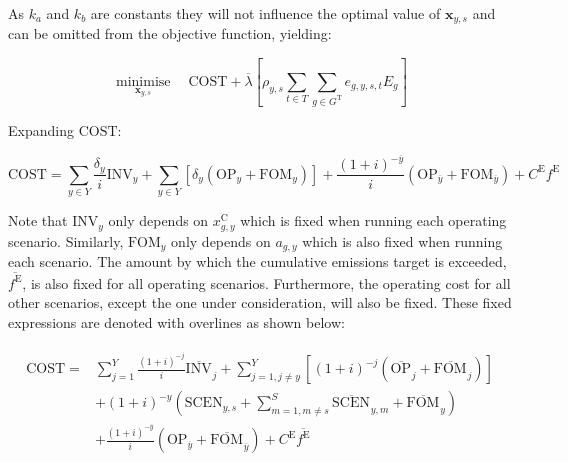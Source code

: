 \documentclass{article}
\newcommand{\sGeneratorsThermal}{G^{\mathrm{T}}}
\newcommand{\sYears}{Y}
\newcommand{\sScenarios}{S}
\newcommand{\sIntervals}{T}
\newcommand{\iGenerator}{g}
\newcommand{\iYear}{y}
\newcommand{\iYearTerminal}{\overline{\iYear}}
\newcommand{\iYearAlias}{j}
\newcommand{\iScenario}{s}
\newcommand{\iScenarioAlias}{m}
\newcommand{\iInterval}{t}
\newcommand{\cOperatingCost}[1][\iYear,\iScenario]{\mathrm{OP}_{#1}}
\newcommand{\cFixedOperationsMaintenanceCost}[1][\iYear]{\mathrm{FOM}_{#1}}
\newcommand{\cScenarioDuration}[1][\iYear,\iScenario]{\rho_{#1}}
\newcommand{\cEmissionsIntensity}[1][\iGenerator]{E_{#1}}
\newcommand{\cInvestmentCost}[1][\iYear]{\mathrm{INV}_{#1}}
\newcommand{\cInterestRate}{i}
\newcommand{\cEmissionsTargetViolationPenalty}{C^{\mathrm{E}}}
\newcommand{\cObjectiveFunction}{\mathrm{COST}}
\newcommand{\cOperatingCostScenario}[1][\iYear,\iScenario]{\mathrm{SCEN}_{#1}}
\newcommand{\cDiscountRate}[1][\iYear]{\delta_{#1}}
\newcommand{\vEnergy}[1][\iGenerator,\iYear,\iScenario,\iInterval]{e_{#1}}
\newcommand{\vInstalledCapacity}[1][\iGenerator,\iYear]{x^{\mathrm{C}}_{#1}}
\newcommand{\vEmissionsTargetViolation}{f^{\mathrm{E}}}
\newcommand{\vInstalledCapacityTotal}[1][\iGenerator,\iYear]{a_{#1}}
\DeclareMathOperator*{\minimise}{minimise}
\begin{document}
As $k_{a}$ and $k_{b}$ are constants they will not influence the optimal value of $\bm{x}_{\iYear,\iScenario}$ and can be omitted from the objective function, yielding:

\begin{equation}
	\minimise\limits_{\bm{x}_{\iYear,\iScenario}} \quad \cObjectiveFunction + \overline{\lambda} \left[\cScenarioDuration\sum\limits_{\iInterval \in \sIntervals}\sum\limits_{\iGenerator \in \sGeneratorsThermal} \vEnergy[\iGenerator,\iYear,\iScenario,\iInterval] \cEmissionsIntensity \right]
\end{equation}

Expanding $\cObjectiveFunction$:

\begin{equation}
	\cObjectiveFunction = \sum\limits_{\iYear \in \sYears} \frac{\cDiscountRate}{\cInterestRate}\cInvestmentCost + \sum\limits_{\iYear \in \sYears} \left[\cDiscountRate (\cOperatingCost[\iYear] + \cFixedOperationsMaintenanceCost) \right] + \frac{(1+\cInterestRate)^{-\iYearTerminal}}{\cInterestRate} \left(\cOperatingCost[\iYearTerminal] + \cFixedOperationsMaintenanceCost[\iYearTerminal] \right) + \cEmissionsTargetViolationPenalty \vEmissionsTargetViolation
\end{equation}

Note that $\cInvestmentCost$ only depends on $\vInstalledCapacity$ which is fixed when running each operating scenario. Similarly, $\cFixedOperationsMaintenanceCost$ only depends on $\vInstalledCapacityTotal$ which is also fixed when running each scenario. The amount by which the cumulative emissions target is exceeded, $\overline{\vEmissionsTargetViolation}$, is also fixed for all operating scenarios. Furthermore, the operating cost for all other scenarios, except the one under consideration, will also be fixed. These fixed expressions are denoted with overlines as shown below:

\begin{align}
	\begin{split}
		\cObjectiveFunction = & \sum\limits_{\iYearAlias=1}^{\sYears} \frac{(1+\cInterestRate)^{-\iYearAlias}}{\cInterestRate}\overline{\cInvestmentCost[]}_{\iYearAlias} + \sum\limits_{\iYearAlias=1, \iYearAlias \neq \iYear}^{\sYears} \left[(1+\cInterestRate)^{-\iYearAlias} (\overline{\cOperatingCost[]}_{\iYearAlias} + \overline{\cFixedOperationsMaintenanceCost[]}_{\iYearAlias}) \right]\\
		& + (1 + \cInterestRate)^{-\iYear}\left(\cOperatingCostScenario + \sum\limits_{\iScenarioAlias = 1,\iScenarioAlias\neq \iScenario}^{\sScenarios}\overline{\cOperatingCostScenario[]}_{\iYear,\iScenarioAlias} + \overline{\cFixedOperationsMaintenanceCost[]}_{\iYear}\right)\\
		& + \frac{(1+\cInterestRate)^{-\iYearTerminal}}{\cInterestRate} \left(\cOperatingCost[\iYearTerminal] + \overline{\cFixedOperationsMaintenanceCost[]}_{\iYearTerminal} \right) + \cEmissionsTargetViolationPenalty \overline{\vEmissionsTargetViolation}\\
	\end{split}
\end{align}
\end{document}
